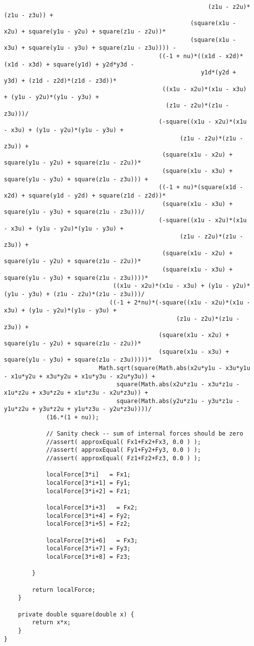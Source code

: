 \begin{lstlisting}
														  (z1u - z2u)*(z1u - z3u)) + 
													 (square(x1u - x2u) + square(y1u - y2u) + square(z1u - z2u))*
													 (square(x1u - x3u) + square(y1u - y3u) + square(z1u - z3u)))) - 
											((-1 + nu)*((x1d - x2d)*(x1d - x3d) + square(y1d) + y2d*y3d - 
														y1d*(y2d + y3d) + (z1d - z2d)*(z1d - z3d))*
											 ((x1u - x2u)*(x1u - x3u) + (y1u - y2u)*(y1u - y3u) + 
											  (z1u - z2u)*(z1u - z3u)))/
											(-square((x1u - x2u)*(x1u - x3u) + (y1u - y2u)*(y1u - y3u) + 
												  (z1u - z2u)*(z1u - z3u)) + 
											 (square(x1u - x2u) + square(y1u - y2u) + square(z1u - z2u))*
											 (square(x1u - x3u) + square(y1u - y3u) + square(z1u - z3u))) + 
											((-1 + nu)*(square(x1d - x2d) + square(y1d - y2d) + square(z1d - z2d))*
											 (square(x1u - x3u) + square(y1u - y3u) + square(z1u - z3u)))/
											(-square((x1u - x2u)*(x1u - x3u) + (y1u - y2u)*(y1u - y3u) + 
												  (z1u - z2u)*(z1u - z3u)) + 
											 (square(x1u - x2u) + square(y1u - y2u) + square(z1u - z2u))*
											 (square(x1u - x3u) + square(y1u - y3u) + square(z1u - z3u))))*
							   ((x1u - x2u)*(x1u - x3u) + (y1u - y2u)*(y1u - y3u) + (z1u - z2u)*(z1u - z3u)))/
							  ((-1 + 2*nu)*(-square((x1u - x2u)*(x1u - x3u) + (y1u - y2u)*(y1u - y3u) + 
												 (z1u - z2u)*(z1u - z3u)) + 
											(square(x1u - x2u) + square(y1u - y2u) + square(z1u - z2u))*
											(square(x1u - x3u) + square(y1u - y3u) + square(z1u - z3u)))))*
						   Math.sqrt(square(Math.abs(x2u*y1u - x3u*y1u - x1u*y2u + x3u*y2u + x1u*y3u - x2u*y3u)) + 
								square(Math.abs(x2u*z1u - x3u*z1u - x1u*z2u + x3u*z2u + x1u*z3u - x2u*z3u)) + 
								square(Math.abs(y2u*z1u - y3u*z1u - y1u*z2u + y3u*z2u + y1u*z3u - y2u*z3u))))/
			(16.*(1 + nu));
			
			// Sanity check -- sum of internal forces should be zero
			//assert( approxEqual( Fx1+Fx2+Fx3, 0.0 ) );
			//assert( approxEqual( Fy1+Fy2+Fy3, 0.0 ) );
			//assert( approxEqual( Fz1+Fz2+Fz3, 0.0 ) );
			
			localForce[3*i]   = Fx1;
			localForce[3*i+1] = Fy1;
			localForce[3*i+2] = Fz1;
			
			localForce[3*i+3]   = Fx2;
			localForce[3*i+4] = Fy2;
			localForce[3*i+5] = Fz2;
			
			localForce[3*i+6]   = Fx3;
			localForce[3*i+7] = Fy3;
			localForce[3*i+8] = Fz3;
			
		}
		
		return localForce;
	}
	
	private double square(double x) {
		return x*x;
	}
}
\end{lstlisting}

